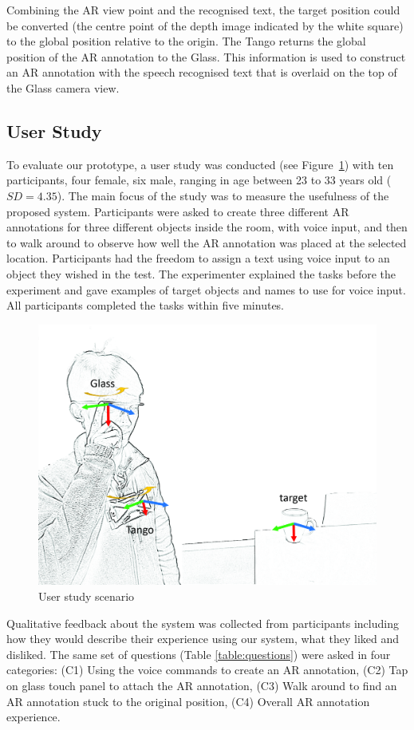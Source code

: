 Combining the AR view point and the recognised text, the target position could be converted (the centre point of the depth image indicated by the white square) to the global position relative to the origin. The Tango returns the global position of the AR annotation to the Glass. This information is used to construct an AR annotation with the speech recognised text that is overlaid on the top of the Glass camera view.

\subsection{User Study}

To evaluate our prototype, a user study was conducted (see Figure~\ref{fig:mgia15:scenario}) with ten participants, four female, six male, ranging in age between 23 to 33 years old ($SD= 4.35$). The main focus of the study was to measure the usefulness of the proposed system. Participants were asked to create three different AR annotations for three different objects inside the room, with voice input, and then to walk around to observe how well the AR annotation was placed at the selected location. Participants had the freedom to assign a text using voice input to an object they wished in the test. The experimenter explained the tasks before the experiment and gave examples of target objects and names to use for voice input. All participants completed the tasks within five minutes. 

\begin{figure}[ht]
  \centering
  \includegraphics[width=0.8\linewidth]{images/mgia15/axis_lo.jpg}
  \caption{User study scenario}
  \label{fig:mgia15:scenario}
\end{figure}

Qualitative feedback about the system was collected from participants including how they would describe their experience using our system, what they liked and disliked. The same set of questions (Table \ref{table:questions}) were asked in four categories: (C1) Using the voice commands to create an AR annotation, (C2) Tap on glass touch panel to attach the AR annotation, (C3)  Walk around to find an AR annotation stuck to the original position, (C4) Overall AR annotation experience.

